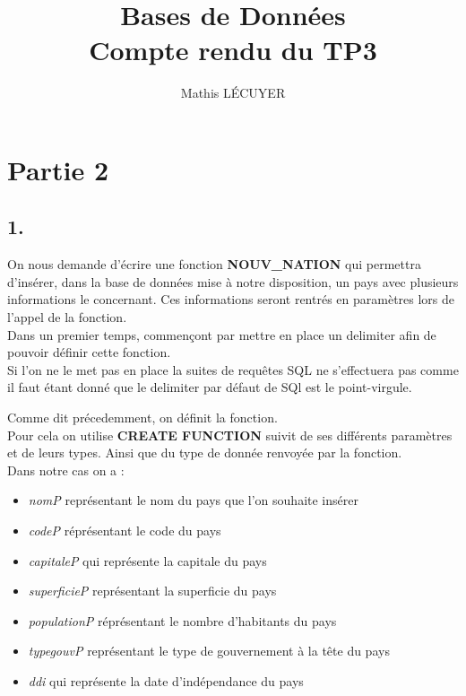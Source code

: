 \documentclass[11pt,a4paper]{article}
\title{Bases de Données\\Compte rendu du TP3}
\author{Mathis LÉCUYER}
\date{}
\begin{document}
\maketitle

\section*{Partie 2}
\subsection*{1.}
On nous demande d'écrire une fonction \textbf{NOUV\_NATION} qui permettra d'insérer, dans la base de données mise à notre disposition, un pays avec plusieurs informations le concernant. Ces informations seront rentrés en paramètres lors de l'appel de la fonction.\\
Dans un premier temps, commençont par mettre en place un delimiter afin de pouvoir définir cette fonction.\\
Si l'on ne le met pas en place la suites de requêtes SQL ne s'effectuera pas comme il faut étant donné que le delimiter par défaut de SQl est le point-virgule.


Comme dit précedemment, on définit la fonction.\\
Pour cela on utilise \textbf{CREATE FUNCTION} suivit de ses différents paramètres et de leurs types. Ainsi que du type de donnée renvoyée par la fonction.\\
Dans notre cas on a :
\begin{itemize}
  \item \emph{nomP} représentant le nom du pays que l'on souhaite insérer
  \item \emph{codeP} réprésentant le code du pays
  \item \emph{capitaleP} qui représente la capitale du pays
  \item \emph{superficieP} représentant la superficie du pays
  \item \emph{populationP} réprésentant le nombre d'habitants du pays
  \item \emph{typegouvP} représentant le type de gouvernement à la tête du pays
  \item \emph{ddi} qui représente la date d'indépendance du pays
\end{itemize}
\end{document}
